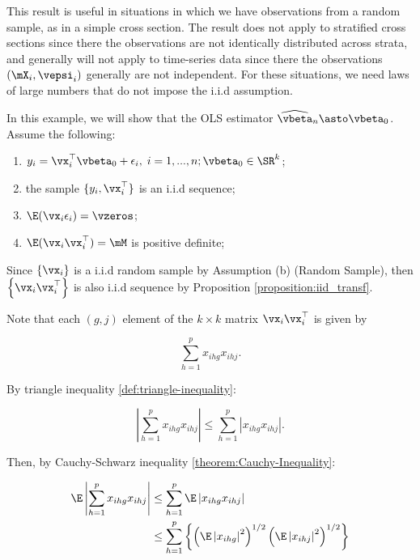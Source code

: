 \documentclass[english,12pt]{book}\usepackage[]{graphicx}\usepackage[]{xcolor}
\begin{document}
This result is useful in situations in which we have observations from a random sample, as in a simple cross section. The result does not apply to stratified cross sections since there the observations are not identically distributed across strata, and generally will not apply to time-series data since there the observations $(\mX_i, \vepsi_i)$ generally are not independent. For these situations, we need laws of large numbers that do not  impose the i.i.d assumption.


\begin{example}
In this example, we will show that the OLS estimator $\widehat{\vbeta}_n \asto \vbeta_0$. Assume the following:

\begin{enumerate}
\item $y_i = \vx_i^\top\vbeta_0 + \epsilon_i,\; i = 1, ..., n; \vbeta_0\in \SR^k$;
\item the sample $\lbrace y_i, \vx_i^\top\rbrace$ is an i.i.d sequence;
\item $\E(\vx_i\epsilon_i) = \vzeros$;
\item $\E(\vx_i\vx_i^\top)= \mM$ is positive definite;
\end{enumerate}

Since $\left\lbrace \vx_i\right\rbrace$ is a i.i.d random sample by Assumption (b) (Random Sample), then $\left\lbrace \vx_i\vx_i^\top\right\rbrace$ is also i.i.d sequence by Proposition \ref{proposition:iid_transf}.

Note that each $(g,j)$ element of the $k\times k$ matrix $\vx_i\vx_i^\top$ is given by 

\begin{equation*}
\sum_{h = 1}^p x_{ihg}x_{ihj}.
\end{equation*}

By triangle inequality \ref{def:triangle-inequality}:

\begin{equation*}
  \left|\sum_{h = 1}^p x_{ihg}x_{ihj}\right| \leq \sum_{h = 1}^p \left|x_{ihg}x_{ihj}\right|. 
\end{equation*}

Then, by Cauchy-Schwarz inequality \ref{theorem:Cauchy-Inequality}:

\begin{equation*}
  \begin{aligned}
    \E\left|\sum_{h = 1}^p x_{ihg}x_{ihj}\right| & \leq \sum_{h = 1}^p  \E\left|x_{ihg}x_{ihj}\right|\\
                                               & \leq   \sum_{h = 1}^p\left\lbrace \left(\E\left|x_{ihg}\right|^2\right)^{1/2} \left(\E\left|x_{ihj}\right|^2\right)^{1/2}\right\rbrace
  \end{aligned}
\end{equation*}


\end{example}
\end{document}
